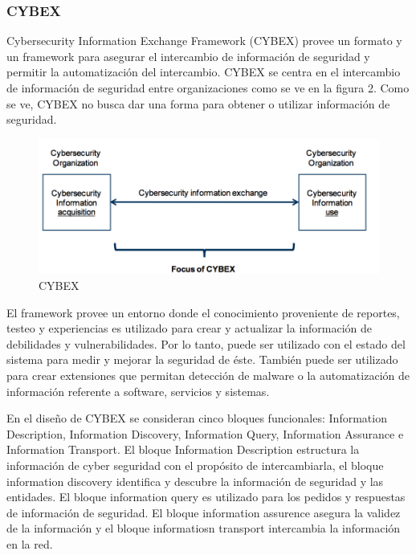 \subsubsection{CYBEX}

Cybersecurity Information Exchange Framework (CYBEX) provee un formato y un 
framework para asegurar el intercambio de información de seguridad y permitir la 
automatización del intercambio. CYBEX se centra en el intercambio de información 
de seguridad entre organizaciones como se ve en la figura 2. Como se ve,
CYBEX no busca dar una forma para obtener o utilizar información de seguridad.

\begin{figure}[ht!]
  \centering
    \includegraphics[width=150mm]{./images/cybex.png}
    \caption{CYBEX \protect\cite{b1}}
\end{figure}

El framework provee un entorno donde el conocimiento proveniente de reportes, 
testeo y experiencias es utilizado para crear y actualizar la información de 
debilidades y vulnerabilidades. Por lo tanto, puede ser utilizado con el estado 
del sistema para medir y mejorar la seguridad de éste. También puede ser 
utilizado para crear extensiones que permitan detección de malware o la 
automatización de información referente a software, servicios y sistemas. 

En el diseño de CYBEX se consideran cinco bloques funcionales: Information 
Description, Information Discovery, Information Query, Information Assurance e 
Information Transport. El bloque Information Description estructura la 
información de cyber seguridad con el propósito de intercambiarla, el bloque 
information discovery identifica y descubre la información de seguridad y las 
entidades. El bloque information query es utilizado para los pedidos y 
respuestas de información de seguridad. El bloque information assurence asegura 
la validez de la información y el bloque informatiosn transport intercambia la 
información en la red.

